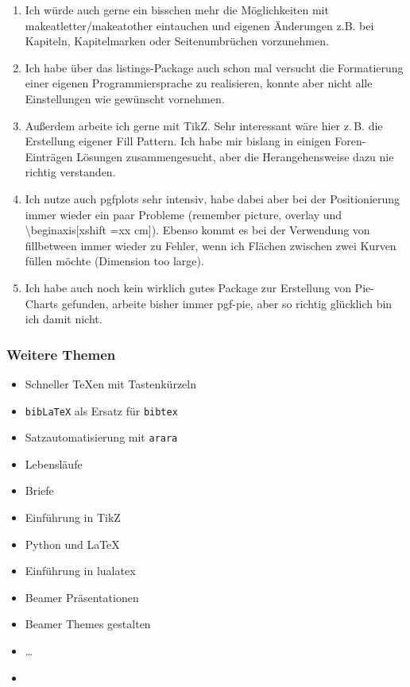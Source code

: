 \documentclass[ngerman]{beamer}
\newcommand{\bb}{\textasteriskcentered\textasteriskcentered\xspace}
\newcommand{\cc}{\textasteriskcentered\textasteriskcentered\textasteriskcentered\xspace}
\begin{document}
\begin{frame}[allowframebreaks]
\begin{enumerate}
\item Ich würde auch gerne ein bisschen mehr die Möglichkeiten mit makeatletter/makeatother eintauchen und eigenen Änderungen z.B. bei Kapiteln, Kapitelmarken oder Seitenumbrüchen vorzunehmen. \bb

\item Ich habe über das listings-Package auch schon mal versucht die Formatierung einer eigenen Programmiersprache zu realisieren, konnte aber nicht alle Einstellungen wie gewünscht vornehmen. \bb

\item 
Außerdem arbeite ich gerne mit TikZ. Sehr interessant wäre hier z.\,B. die Erstellung eigener Fill Pattern. Ich habe mir bislang in einigen Foren-Einträgen Lösungen zusammengesucht, aber die Herangehensweise dazu nie richtig verstanden. \cc

\item Ich nutze auch pgfplots sehr intensiv, habe dabei aber bei der Positionierung immer wieder ein paar Probleme (remember picture, overlay und \textbackslash  begin{axis}[xshift =xx cm]).
Ebenso kommt es bei der Verwendung von fillbetween immer wieder zu Fehler, wenn ich Flächen zwischen zwei Kurven füllen möchte (Dimension too large). \cc

\item 
Ich habe auch noch kein wirklich gutes Package zur Erstellung von Pie-Charts gefunden, arbeite bisher immer pgf-pie, aber so richtig glücklich bin ich damit nicht. \bb

\end{enumerate}
\end{frame}

\begin{frame}
\frametitle{Weitere Themen}

\begin{itemize}
\item Schneller TeXen mit Tastenkürzeln \checkmark
\item \texttt{bibLaTeX} als Ersatz für \texttt{bibtex}
\item Satzautomatisierung mit \texttt{arara} \checkmark
\item Lebensläufe
\item Briefe \checkmark
\item Einführung in TikZ
\item Python und LaTeX
\item Einführung in lualatex
\item Beamer Präsentationen \checkmark
\item Beamer Themes gestalten
\item \ldots
\item \jobname
\end{itemize}
\end{frame}
\end{document}
